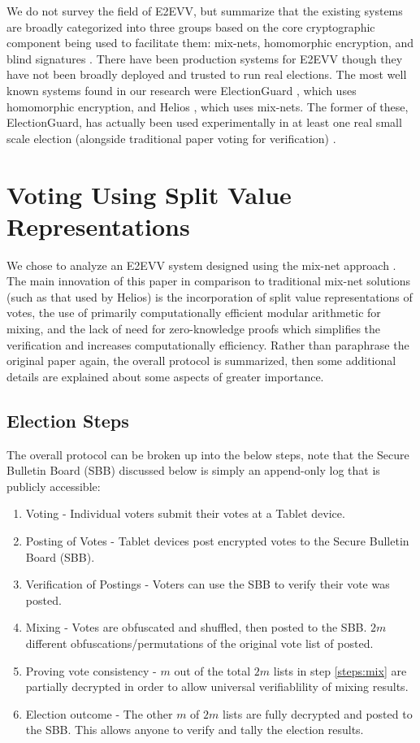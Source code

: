 \documentclass{article}
\begin{document}
We do not survey the field of E2EVV, but summarize that the existing systems are broadly categorized into three groups based on the core cryptographic component being used to facilitate them: mix-nets, homomorphic encryption, and blind signatures \cite{mit}. There have been production systems for E2EVV though they have not been broadly deployed and trusted to run real elections. The most well known systems found in our research were ElectionGuard \cite{election_guard}\cite{eg_github}, which uses homomorphic encryption, and Helios \cite{helios}, which uses mix-nets. The former of these, ElectionGuard, has actually been used experimentally in at least one real small scale election (alongside traditional paper voting for verification) \cite{newyorker}.

\section{Voting Using Split Value Representations}
We chose to analyze an E2EVV system designed using the mix-net approach \cite{svr_vote}. The main innovation of this paper in comparison to traditional mix-net solutions (such as that used by Helios) is the incorporation of split value representations of votes, the use of primarily computationally efficient modular arithmetic for mixing, and the lack of need for zero-knowledge proofs which simplifies the verification and increases computationally efficiency. Rather than paraphrase the original paper again, the overall protocol is summarized, then some additional details are explained about some aspects of greater importance.

\subsection{Election Steps}
The overall protocol can be broken up into the below steps, note that the Secure Bulletin Board (SBB) discussed below is simply an append-only log that is publicly accessible:
\begin{enumerate}
\item
    Voting - Individual voters submit their votes at a Tablet device.
\item
    Posting of Votes - Tablet devices post encrypted votes to the Secure Bulletin Board (SBB).
\item
    Verification of Postings - Voters can use the SBB to verify their vote was posted.
\item \label{steps:mix}
    Mixing - Votes are obfuscated and shuffled, then posted to the SBB. $2m$ different obfuscations/permutations of the original vote list of posted.
\item \label{steps:proof}
    Proving vote consistency - $m$ out of the total $2m$ lists in step \ref{steps:mix} are partially decrypted in order to allow universal verifiablility of mixing results.
\item \label{steps:outcome}
    Election outcome - The other $m$ of $2m$ lists are fully decrypted and posted to the SBB. This allows anyone to verify and tally the election results.
\end{enumerate}
\end{document}

